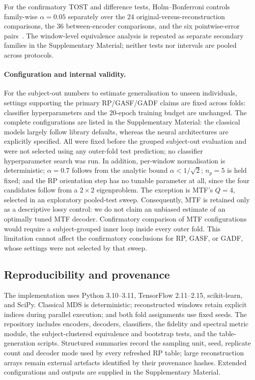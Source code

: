 \documentclass[5p]{elsarticle}
\begin{document}
For the confirmatory TOST and difference tests, Holm--Bonferroni controls family-wise \(\alpha=0.05\) separately over the 24 original-versus-reconstruction comparisons, the 36 between-encoder comparisons, and the six pointwise-error pairs~\cite{Holm1979}. The window-level equivalence analysis is repeated as separate secondary families in the Supplementary Material; neither tests nor intervals are pooled across protocols.

\paragraph{Configuration and internal validity.}
For the subject-out numbers to estimate generalisation to unseen individuals, settings supporting the primary RP/GASF/GADF claims are fixed across folds: classifier hyperparameters and the 20-epoch training budget are unchanged. The complete configurations are listed in the Supplementary Material: the classical models largely follow library defaults, whereas the neural architectures are explicitly specified. All were fixed before the grouped subject-out evaluation and were not selected using any outer-fold test prediction; no classifier hyperparameter search was run. In addition, per-window normalisation is deterministic; \(\alpha=0.7\) follows from the analytic bound \(\alpha<1/\sqrt2\); \(n_p=5\) is held fixed; and the RP orientation step has no tunable parameter at all, since the four candidates follow from a \(2\times2\) eigenproblem. The exception is MTF's \(Q=4\), selected in an exploratory pooled-test sweep. Consequently, MTF is retained only as a descriptive lossy control: we do not claim an unbiased estimate of an optimally tuned MTF decoder. Confirmatory comparison of MTF configurations would require a subject-grouped inner loop inside every outer fold. This limitation cannot affect the confirmatory conclusions for RP, GASF, or GADF, whose settings were not selected by that sweep.
\subsection{Reproducibility and provenance}\label{sec:reproducibility}
The implementation uses Python 3.10--3.11, TensorFlow 2.11--2.15, scikit-learn, and SciPy. Classical MDS is deterministic; reconstructed windows retain explicit indices during parallel execution; and both fold assignments use fixed seeds. The repository includes encoders, decoders, classifiers, the fidelity and spectral metric module, the subject-clustered equivalence and bootstrap tests, and the table-generation scripts. Structured summaries record the sampling unit, seed, replicate count and decoder mode used by every refreshed RP table; large reconstruction arrays remain external artefacts identified by their provenance hashes. Extended configurations and outputs are supplied in the Supplementary Material.
\end{document}
